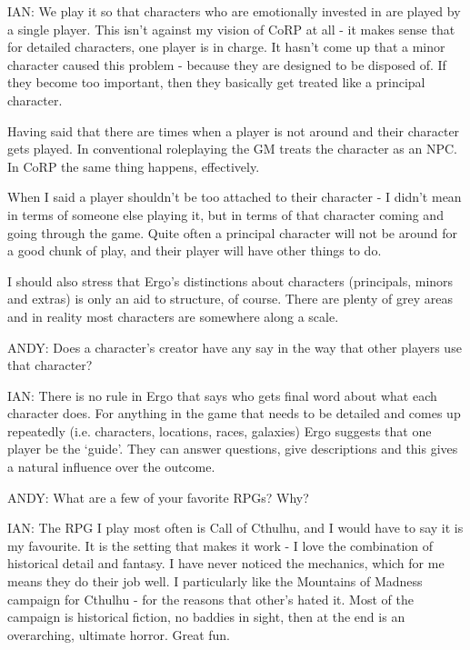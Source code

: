 \documentclass[twoside]{book}
\begin{document}
\begin{description}
\item{IAN:} We play it so that characters who are emotionally invested in are played by a single player. This isn't against my vision of CoRP at all - it makes sense that for detailed characters, one player is in charge. It hasn't come up that a minor character caused this problem - because they are designed to be disposed of. If they become too important, then they basically get treated like a principal character.

Having said that there are times when a player is not around and their character gets played. In conventional roleplaying the GM treats the character as an NPC. In CoRP the same thing happens, effectively.

When I said a player shouldn't be too attached to their character - I didn't mean in terms of someone else playing it, but in terms of that character coming and going through the game. Quite often a principal character will not be around for a good chunk of play, and their player will have other things to do.

I should also stress that Ergo's distinctions about characters (principals, minors and extras) is only an aid to structure, of course. There are plenty of grey areas and in reality most characters are somewhere along a scale.

\item{ANDY:} Does a character's creator have any say in the way that other players use that character?

\item{IAN:} There is no rule in Ergo that says who gets final word about what each character does. For anything in the game that needs to be detailed and comes up repeatedly (i.e. characters, locations, races, galaxies) Ergo suggests that one player be the `guide'. They can answer questions, give descriptions and this gives a natural influence over the outcome.

\item{ANDY:} What are a few of your favorite RPGs? Why?

\item{IAN:} The RPG I play most often is Call of Cthulhu, and I would have to say it is my favourite. It is the setting that makes it work - I love the combination of historical detail and fantasy. I have never noticed the mechanics, which for me means they do their job well. I particularly like the Mountains of Madness campaign for Cthulhu - for the reasons that other's hated it. Most of the campaign is historical fiction, no baddies in sight, then at the end is an overarching, ultimate horror. Great fun.


\end{description}
\end{document}
